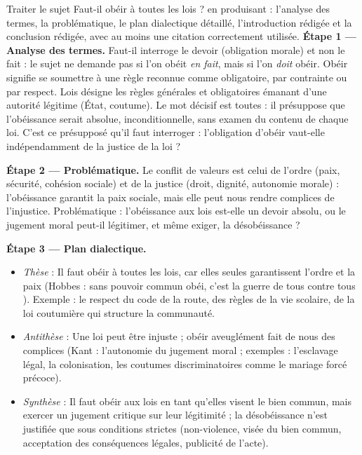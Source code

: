 \documentclass[11pt]{article}
\newcommand{\cle}[1]{{\popxbold\color{popdark}#1}}
\begin{document}
\begin{exoresolu}
Traiter le sujet \guillemotleft Faut-il obéir à toutes les lois ? \guillemotright en produisant : l'analyse des termes, la problématique, le plan dialectique détaillé, l'introduction rédigée et la conclusion rédigée, avec au moins une citation correctement utilisée.
\tcblower
\textbf{Étape 1 — Analyse des termes.} \guillemotleft Faut-il \guillemotright interroge le devoir (obligation morale) et non le fait : le sujet ne demande pas si l'on obéit \emph{en fait}, mais si l'on \emph{doit} obéir. \guillemotleft Obéir \guillemotright signifie se soumettre à une règle reconnue comme obligatoire, par contrainte ou par respect. \guillemotleft Lois \guillemotright désigne les règles générales et obligatoires émanant d'une autorité légitime (État, coutume). Le mot décisif est \guillemotleft toutes \guillemotright : il présuppose que l'obéissance serait absolue, inconditionnelle, sans examen du contenu de chaque loi. C'est ce présupposé qu'il faut interroger : l'obligation d'obéir vaut-elle indépendamment de la justice de la loi ?

\textbf{Étape 2 — Problématique.} Le conflit de valeurs est celui de l'\cle{ordre} (paix, sécurité, cohésion sociale) et de la \cle{justice} (droit, dignité, autonomie morale) : l'obéissance garantit la paix sociale, mais elle peut nous rendre complices de l'injustice. Problématique : l'obéissance aux lois est-elle un devoir absolu, ou le jugement moral peut-il légitimer, et même exiger, la désobéissance ?

\textbf{Étape 3 — Plan dialectique.}
\begin{itemize}
\item \emph{Thèse} : Il faut obéir à toutes les lois, car elles seules garantissent l'ordre et la paix (Hobbes : sans pouvoir commun obéi, c'est la \guillemotleft guerre de tous contre tous \guillemotright). Exemple : le respect du code de la route, des règles de la vie scolaire, de la loi coutumière qui structure la communauté.
\item \emph{Antithèse} : Une loi peut être injuste ; obéir aveuglément fait de nous des complices (Kant : l'autonomie du jugement moral ; exemples : l'esclavage légal, la colonisation, les coutumes discriminatoires comme le mariage forcé précoce).
\item \emph{Synthèse} : Il faut obéir aux lois en tant qu'elles visent le bien commun, mais exercer un jugement critique sur leur légitimité ; la désobéissance n'est justifiée que sous conditions strictes (non-violence, visée du bien commun, acceptation des conséquences légales, publicité de l'acte).
\end{itemize}


\end{exoresolu}
\end{document}
